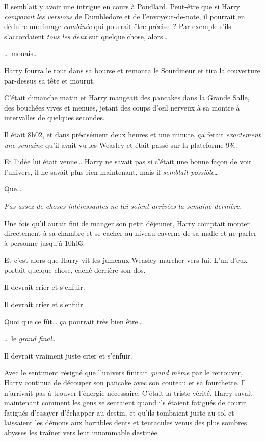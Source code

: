 Il semblait y avoir une intrigue en cours à Poudlard.
Peut-être que si Harry \emph{comparait} \emph{les versions} de Dumbledore et de l'envoyeur-de-note, il pourrait en déduire une image \emph{combinée} qui pourrait être précise~?
Par exemple s'ils s'accordaient \emph{tous les deux} sur quelque chose, alors…

… mouais…

Harry fourra le tout dans sa bourse et remonta le Sourdineur et tira la couverture par-dessus sa tête et mourut.

\later

C'était dimanche matin et Harry mangeait des pancakes dans la Grande Salle, des bouchées vives et menues, jetant des coups d'œil nerveux à sa montre à intervalles de quelques secondes.

Il était 8h02, et dans précisément deux heures et une minute, ça ferait \emph{exactement une semaine} qu'il avait vu les Weasley et était passé sur la plateforme 9¾.

Et l'idée lui était venue…
Harry ne savait pas si c'était une bonne façon de voir l'univers, il ne savait plus rien maintenant, mais il \emph{semblait possible}…

Que…

\emph{Pas assez de choses intéressantes ne lui soient arrivées la semaine dernière.}

Une fois qu'il aurait fini de manger son petit déjeuner, Harry comptait monter directement à sa chambre et se cacher au niveau caverne de sa malle et ne parler à personne jusqu'à 10h03.

Et c'est alors que Harry vit les jumeaux Weasley marcher vers lui.
L'un d'eux portait quelque chose, caché derrière son dos.

Il devrait crier et s'enfuir.

Il devrait crier et s'enfuir.

Quoi que ce fût… ça pourrait très bien être…

… le \emph{grand final}…

Il devrait vraiment juste crier et s'enfuir.

Avec le sentiment résigné que l'univers finirait \emph{quand même} par le retrouver, Harry continua de découper son pancake avec son couteau et sa fourchette.
Il n'arrivait pas à trouver l'énergie nécessaire.
C'était la triste vérité.
Harry savait maintenant comment les gens se sentaient quand ils étaient fatigués de courir, fatigués d'essayer d'échapper au destin, et qu'ils tombaient juste au sol et laissaient les démons aux horribles dents et tentacules venus des plus sombres abysses les traîner vers leur innommable destinée.

